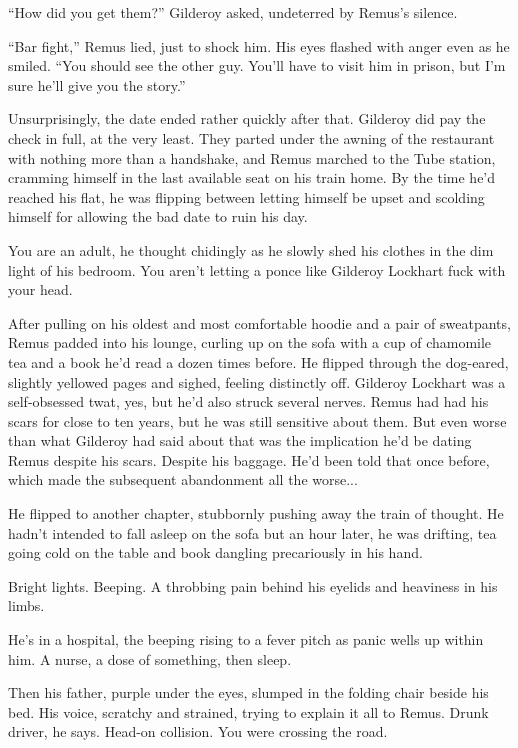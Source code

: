 “How did you get them?” Gilderoy asked, undeterred by Remus’s silence.

“Bar fight,” Remus lied, just to shock him. His eyes flashed with anger even as he smiled. “You should see the other guy. You’ll have to visit him in prison, but I’m sure he’ll give you the story.”

Unsurprisingly, the date ended rather quickly after that. Gilderoy did pay the check in full, at the very least. They parted under the awning of the restaurant with nothing more than a handshake, and Remus marched to the Tube station, cramming himself in the last available seat on his train home. By the time he’d reached his flat, he was flipping between letting himself be upset and scolding himself for allowing the bad date to ruin his day.

You are an adult, he thought chidingly as he slowly shed his clothes in the dim light of his bedroom. You aren’t letting a ponce like Gilderoy Lockhart fuck with your head.

After pulling on his oldest and most comfortable hoodie and a pair of sweatpants, Remus padded into his lounge, curling up on the sofa with a cup of chamomile tea and a book he’d read a dozen times before. He flipped through the dog-eared, slightly yellowed pages and sighed, feeling distinctly off. Gilderoy Lockhart was a self-obsessed twat, yes, but he’d also struck several nerves. Remus had had his scars for close to ten years, but he was still sensitive about them. But even worse than what Gilderoy had said about that was the implication he’d be dating Remus despite his scars. Despite his baggage. He’d been told that once before, which made the subsequent abandonment all the worse...

He flipped to another chapter, stubbornly pushing away the train of thought. He hadn’t intended to fall asleep on the sofa but an hour later, he was drifting, tea going cold on the table and book dangling precariously in his hand.

Bright lights. Beeping. A throbbing pain behind his eyelids and heaviness in his limbs.

He’s in a hospital, the beeping rising to a fever pitch as panic wells up within him. A nurse, a dose of something, then sleep.

Then his father, purple under the eyes, slumped in the folding chair beside his bed. His voice, scratchy and strained, trying to explain it all to Remus. Drunk driver, he says. Head-on collision. You were crossing the road.

